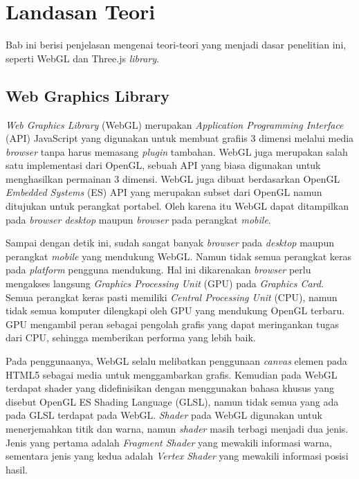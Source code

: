 \chapter{Landasan Teori}
\label{chap:teori}
Bab ini berisi penjelasan mengenai teori-teori yang menjadi dasar penelitian ini, seperti WebGL dan Three.js \textit{library}.

\section{Web Graphics Library}
\label{sec:webgl} 
\textit{Web Graphics Library} (WebGL) merupakan \textit{Application Programming Interface} (API) JavaScript yang digunakan untuk membuat grafiis 3 dimensi melalui media \textit{browser} tanpa harus memasang \textit{plugin} tambahan. WebGL juga merupakan salah satu implementasi dari OpenGL, sebuah API yang biasa digunakan untuk menghasilkan permainan 3 dimensi. WebGL juga dibuat berdasarkan OpenGL \textit{Embedded Systems} (ES) API yang merupakan subset dari OpenGL namun ditujukan untuk perangkat portabel. Oleh karena itu WebGL dapat ditampilkan pada \textit{browser desktop} maupun \textit{browser} pada perangkat \textit{mobile}.

Sampai dengan detik ini, sudah sangat banyak \textit{browser} pada \textit{desktop} maupun perangkat \textit{mobile} yang mendukung WebGL. Namun tidak semua perangkat keras pada \textit{platform} pengguna mendukung. Hal ini dikarenakan \textit{browser} perlu mengakses langsung \textit{Graphics Processing Unit} (GPU) pada \textit{Graphics Card}. Semua perangkat keras pasti memiliki \textit{Central Processing Unit} (CPU), namun tidak semua komputer dilengkapi oleh GPU yang mendukung OpenGL terbaru. GPU mengambil peran sebagai pengolah grafis yang dapat meringankan tugas dari CPU, sehingga memberikan performa yang lebih baik.

Pada penggunaanya, WebGL selalu melibatkan penggunaan \textit{canvas} elemen pada HTML5 sebagai media untuk menggambarkan grafis. Kemudian pada WebGL terdapat shader yang didefinisikan dengan menggunakan bahasa khusus yang disebut OpenGL ES Shading Language (GLSL), namun tidak semua yang ada pada GLSL terdapat pada WebGL. \textit{Shader} pada WebGL digunakan untuk menerjemahkan titik dan warna, namun \textit{shader} masih terbagi menjadi dua jenis. Jenis yang pertama adalah \textit{Fragment Shader} yang mewakili informasi warna, sementara jenis yang kedua adalah \textit{Vertex Shader} yang mewakili informasi posisi hasil.


